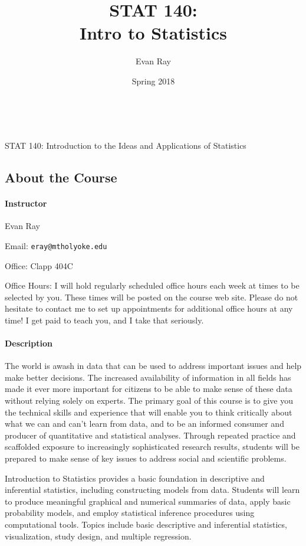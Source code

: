 \documentclass[11pt]{article}
\title{STAT 140:\\Intro to Statistics}
\author{Evan Ray}
\date{Spring 2018}
\begin{document}

\ \\
\vspace{.01in}
\begin{center}
{\large STAT 140: Introduction to the Ideas and Applications of Statistics}
\end{center}
\subsection*{About the Course}

\paragraph{Instructor}

Evan Ray

Email: \texttt{eray@mtholyoke.edu}

Office: Clapp 404C

Office Hours: I will hold regularly scheduled office hours each week at times to be selected by you.  These times will be posted on the course web site.  Please do not hesitate to contact me to set up appointments for additional office hours at any time!  I get paid to teach you, and I take that seriously.

\paragraph{Description}

The world is awash in data that can be used to address important issues and help make better decisions.  The increased availability of information in all fields has made it ever more important for citizens to be able to make sense of these data without relying solely on experts.  The primary goal of this course is to give you the technical skills and experience that will enable you to think critically about what we can and can't learn from data, and to be an informed consumer and producer of quantitative and statistical analyses.  Through repeated practice and scaffolded exposure to increasingly sophisticated research results, students will be prepared to make sense of key issues to address social and scientific problems.

Introduction to Statistics provides a basic foundation in descriptive and inferential statistics, including constructing models from data. Students will learn to produce meaningful graphical and numerical summaries of data, apply basic probability models, and employ statistical inference procedures using computational tools. Topics include basic descriptive and inferential statistics, visualization, study design, and multiple regression.
\end{document}
